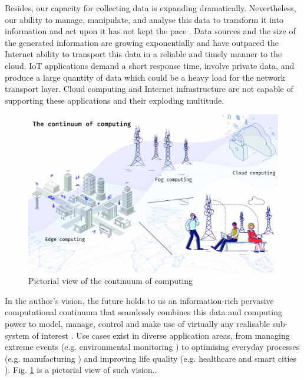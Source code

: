 Besides, our capacity for collecting data is expanding dramatically. Nevertheless, our ability to manage, manipulate, and analyse this data to transform it into information and act upon it has not kept the pace \cite{computing-in-continuum}. Data sources and the size of the generated information are growing exponentially and have outpaced the Internet ability to transport this data in a reliable and timely manner to the cloud. IoT applications demand a short response time, involve private data, and produce a large quantity of data which could be a heavy load for the network transport layer. Cloud computing and Internet infrastructure are not capable of supporting these applications and their exploding multitude.

\begin{figure}[h]
\centering
\includegraphics[width=\columnwidth]{figures/continuum}
\caption{Pictorial view of the continuum of computing \label{fig:continuum}}
\end{figure}

In the author's vision, the future holds to us an information-rich pervasive computational continuum that seamlessly combines this data and computing power to model, manage, control and make use of virtually any realisable sub-system of interest \cite{computing-in-continuum}. Use cases exist in diverse application areas, from managing extreme events (e.g. environmental monitoring \cite{levee}) to optimising everyday processes (e.g. manufacturing \cite{iot-manifacturing}) and improving life quality (e.g. healthcare \cite{iot-healthcare} and smart cities \cite{data-analytics-iot}). Fig. \ref{fig:continuum} is a pictorial view of such vision..

